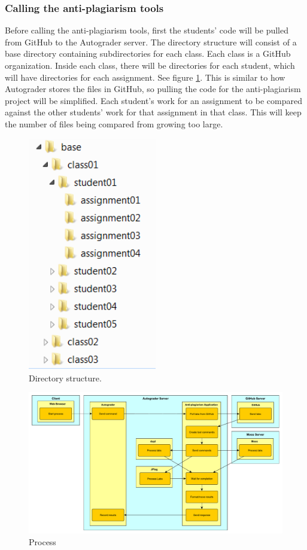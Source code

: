 \documentclass[10pt,journal,compsoc]{IEEEtran}
\begin{document}
			\subsubsection{Calling the anti-plagiarism tools}
			Before calling the anti-plagiarism tools, first the students' code will be pulled from GitHub to the Autograder server. The directory structure will consist of a base directory containing subdirectories for each class. Each class is a GitHub organization. Inside each class, there will be directories for each student, which will have directories for each assignment. See figure \ref{fig:directories}. This is similar to how Autograder stores the files in GitHub, so pulling the code for the anti-plagiarism project will be simplified. Each student's work for an assignment to be compared against the other students' work for that assignment in that class. This will keep the number of files being compared from growing too large. 
	
			\begin{figure}[h!]
				\includegraphics[width=0.5\textwidth]{Directories.png}
				\caption{Directory structure.}
				\label{fig:directories}
			\end{figure}
			
			\begin{figure}[h!]
				\includegraphics[width=1.0\textwidth]{process.pdf}
				\caption{Process}
				\label{fig:process}
			\end{figure}
	
\end{document}
